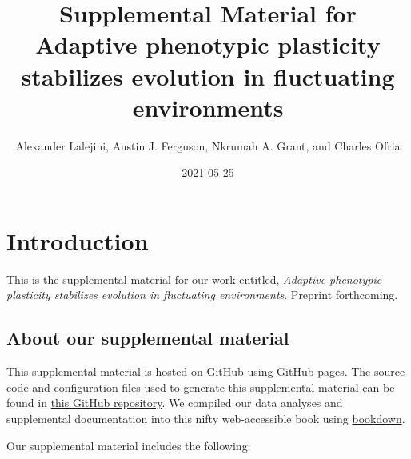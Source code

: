 \documentclass[]{book}
\title{Supplemental Material for Adaptive phenotypic plasticity stabilizes evolution in fluctuating environments}
\author{Alexander Lalejini, Austin J. Ferguson, Nkrumah A. Grant, and Charles Ofria}
\date{2021-05-25}
\begin{document}
\maketitle

{
\setcounter{tocdepth}{1}
\tableofcontents
}
\hypertarget{introduction}{%
\chapter{Introduction}\label{introduction}}

This is the supplemental material for our work entitled, \emph{Adaptive phenotypic plasticity stabilizes evolution in fluctuating environments}.
Preprint forthcoming.

\hypertarget{about-our-supplemental-material}{%
\section{About our supplemental material}\label{about-our-supplemental-material}}

This supplemental material is hosted on \href{https://github.com/}{GitHub} using GitHub pages.
The source code and configuration files used to generate this supplemental material can be found in \href{https://github.com/amlalejini/evolutionary-consequences-of-plasticity}{this GitHub repository}.
We compiled our data analyses and supplemental documentation into this nifty web-accessible book using \href{https://bookdown.org/}{bookdown}.

Our supplemental material includes the following:
\end{document}
